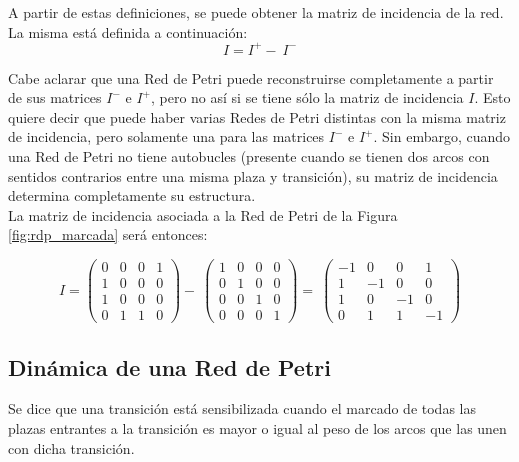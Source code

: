 A partir de estas definiciones, se puede obtener la matriz de incidencia de la red. La misma está definida a continuación:\\

\begin{equation} I = I^+ -\ I^- \end{equation}

Cabe aclarar que una Red de Petri puede reconstruirse completamente a partir de sus matrices $I^-$ e $I^+$, pero no así si se tiene sólo la matriz de incidencia $I$. Esto quiere decir que puede haber varias Redes de Petri distintas con la misma matriz de incidencia, pero solamente una para las matrices $I^-$ e $I^+$. Sin embargo, cuando una Red de Petri no tiene autobucles (presente cuando se tienen dos arcos con sentidos contrarios entre una misma plaza y transición), su matriz de incidencia determina completamente su estructura.\\

La matriz de incidencia asociada a la Red de Petri de la Figura \ref{fig:rdp_marcada} será entonces:

\begin{equation}
I =
    \begin{pmatrix}
        0 & 0 & 0 & 1\\
        1 & 0 & 0 & 0\\
        1 & 0 & 0 & 0\\
        0 & 1 & 1 & 0
    \end{pmatrix}
-\ 
    \begin{pmatrix}
        1 & 0 & 0 & 0\\
        0 & 1 & 0 & 0\\
        0 & 0 & 1 & 0\\
        0 & 0 & 0 & 1
    \end{pmatrix}
=\ 
    \begin{pmatrix}
        -1 & 0 & 0 & 1\\
        1 & -1 & 0 & 0\\
        1 & 0 & -1 & 0\\
        0 & 1 & 1 & -1
    \end{pmatrix}
\end{equation}

\subsection{Dinámica de una Red de Petri}
Se dice que una transición está sensibilizada cuando el marcado de todas las plazas entrantes a la transición es mayor o igual al peso de los arcos que las unen con dicha transición. \cite{papermico}\\

